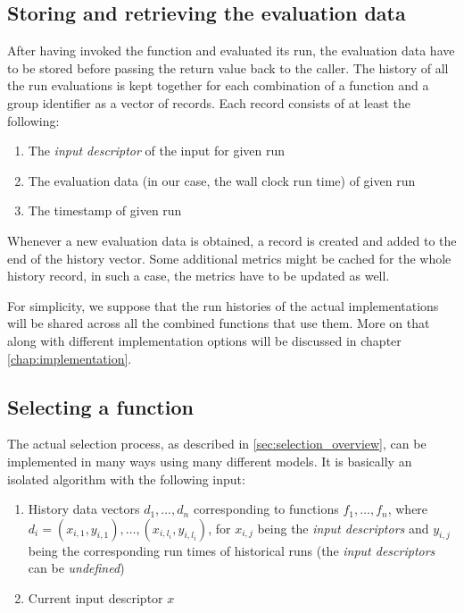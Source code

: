 \subsection{Storing and retrieving the evaluation data}
\label{subsec:storing_evaluation_data}

After having invoked the function and evaluated its run, the evaluation data have to be stored before passing the return value back to the caller. The history of all the run evaluations is kept together for each combination of a function and a group identifier as a vector of records. Each record consists of at least the following:

\begin{enumerate}
	\item The \textit{input descriptor} of the input for given run
	\item The evaluation data (in our case, the wall clock run time) of given run
	\item The timestamp of given run
\end{enumerate}

Whenever a new evaluation data is obtained, a record is created and added to the end of the history vector. Some additional metrics might be cached for the whole history record, in such a case, the metrics have to be updated as well.

For simplicity, we suppose that the run histories of the actual implementations will be shared across all the combined functions that use them. More on that along with different implementation options will be discussed in chapter \ref{chap:implementation}.

\subsection{Selecting a function}
\label{subsec:selecting_function}

The actual selection process, as described in \ref{sec:selection_overview}, can be implemented in many ways using many different models. It is basically an isolated algorithm with the following input:
\begin{enumerate}
	\item History data vectors $d_1,\dots,d_n$ corresponding to functions $f_1,\dots,f_n$, where $d_i = (x_{i,1}, y_{i,1}),\dots,(x_{i,l_i}, y_{i,l_i})$, for $x_{i,j}$ being the \textit{input descriptors} and $y_{i,j}$ being the corresponding run times of historical runs (the \textit{input descriptors} can be \textit{undefined})
	\item Current input descriptor $x$
\end{enumerate}

